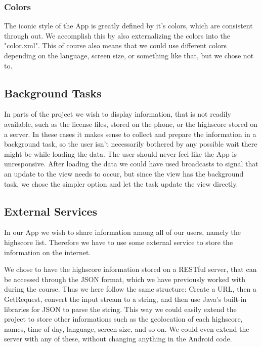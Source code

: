 \documentclass[a4paper, 12pt]{article}
\begin{document}
\subsubsection{Colors}
The iconic style of the App is greatly defined by it's colors, which are consistent through out. We accomplish this by also externalizing the colors into the "color.xml". This of course also means that we could use different colors depending on the language, screen size, or something like that, but we chose not to.

\subsection{Background Tasks}
In parts of the project we wish to display information, that is not
readily available, such as the license files, stored on the phone, or
the highscore stored on a server. In these cases it makes sense to
collect and prepare the information in a background task, so the user
isn't necessarily bothered by any possible wait there might be while
loading the data. The user should never feel like the App is unresponsive. After loading the data we could have used broadcasts to signal that an update to the view needs to occur, but since the view has the background task, we chose the simpler option and let the task update the view directly.

\subsection{External Services}
In our App we wish to share information among all of our users, namely the highscore list. Therefore we have to use some external service to store the information on the internet.

We chose to have the highscore information stored on a RESTful server, that can be accessed through
the JSON format, which we have previously worked with during the
course. Thus we here follow the same structure: Create a URL, then a
GetRequest, convert the input stream to a string, and then use Java's
built-in libraries for JSON to parse the string. This way we could
easily extend the project to store other informations such as the
geolocation of each highscore, names, time of day, language, screen size, and so on. We could
even extend the server with any of these, without changing anything in
the Android code.

\end{document}
